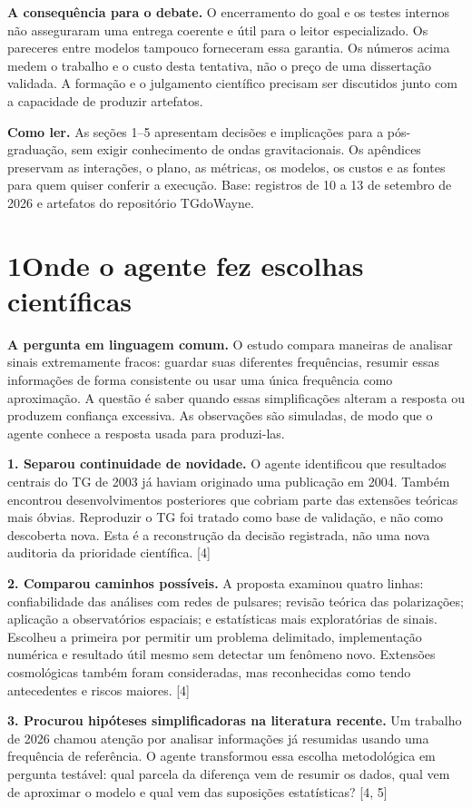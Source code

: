 \documentclass[11pt,a4paper]{article}
\newcommand{\fonte}[1]{{\small\color{navy}[#1]}}
\newcommand{\titulo}[2]{\section*{\color{navy}#1\quad #2}}
\begin{document}
\textbf{A consequência para o debate.} O encerramento do goal e os testes internos não asseguraram uma entrega coerente e útil para o leitor especializado. Os pareceres entre modelos tampouco forneceram essa garantia. Os números acima medem o trabalho e o custo desta tentativa, não o preço de uma dissertação validada. A formação e o julgamento científico precisam ser discutidos junto com a capacidade de produzir artefatos.

\vfill
\textbf{Como ler.} As seções 1--5 apresentam decisões e implicações para a pós-graduação, sem exigir conhecimento de ondas gravitacionais. Os apêndices preservam as interações, o plano, as métricas, os modelos, os custos e as fontes para quem quiser conferir a execução. Base: registros de 10 a 13 de setembro de 2026 e artefatos do repositório TGdoWayne.
\newpage
\titulo{1}{Onde o agente fez escolhas científicas}
\textbf{A pergunta em linguagem comum.} O estudo compara maneiras de analisar sinais extremamente fracos: guardar suas diferentes frequências, resumir essas informações de forma consistente ou usar uma única frequência como aproximação. A questão é saber quando essas simplificações alteram a resposta ou produzem confiança excessiva. As observações são simuladas, de modo que o agente conhece a resposta usada para produzi-las.

\textbf{1. Separou continuidade de novidade.} O agente identificou que resultados centrais do TG de 2003 já haviam originado uma publicação em 2004. Também encontrou desenvolvimentos posteriores que cobriam parte das extensões teóricas mais óbvias. Reproduzir o TG foi tratado como base de validação, e não como descoberta nova. Esta é a reconstrução da decisão registrada, não uma nova auditoria da prioridade científica. \fonte{4}

\textbf{2. Comparou caminhos possíveis.} A proposta examinou quatro linhas: confiabilidade das análises com redes de pulsares; revisão teórica das polarizações; aplicação a observatórios espaciais; e estatísticas mais exploratórias de sinais. Escolheu a primeira por permitir um problema delimitado, implementação numérica e resultado útil mesmo sem detectar um fenômeno novo. Extensões cosmológicas também foram consideradas, mas reconhecidas como tendo antecedentes e riscos maiores. \fonte{4}

\textbf{3. Procurou hipóteses simplificadoras na literatura recente.} Um trabalho de 2026 chamou atenção por analisar informações já resumidas usando uma frequência de referência. O agente transformou essa escolha metodológica em pergunta testável: qual parcela da diferença vem de resumir os dados, qual vem de aproximar o modelo e qual vem das suposições estatísticas? \fonte{4, 5}
\end{document}

